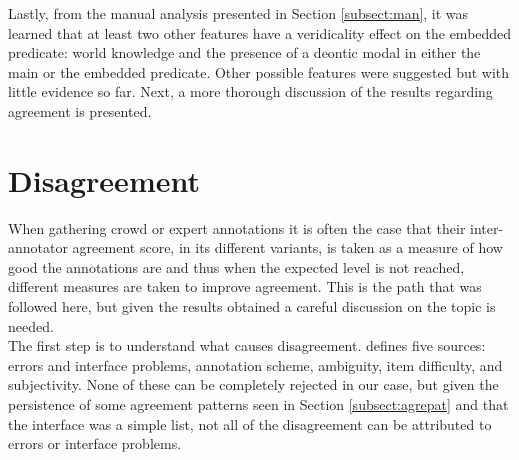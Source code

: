 Lastly, from the manual analysis presented in Section \ref{subsect:man}, it was learned that at least two other features have a veridicality effect on the embedded predicate: world knowledge and the presence of a deontic modal in either the main or the embedded predicate. Other possible features were suggested but with little evidence so far. Next, a more thorough discussion of the results regarding agreement is presented.\\

\section{Disagreement}\label{sect:dis}
When gathering crowd or expert annotations it is often the case that their inter-annotator agreement score, in its different variants, is taken as a measure of how good the annotations are and thus when the expected level is not reached, different measures are taken to improve agreement. This is the path that was followed here, but given the results obtained a careful discussion on the topic is needed.\\

The first step is to understand what causes disagreement. \citet{uma2021learning} defines five sources: errors and interface problems, annotation scheme, ambiguity, item difficulty, and subjectivity. None of these can be completely rejected in our case, but given the persistence of some agreement patterns seen in Section \ref{subsect:agrepat} and that the interface was a simple list, not all of the disagreement can be attributed to errors or interface problems.\\ 

